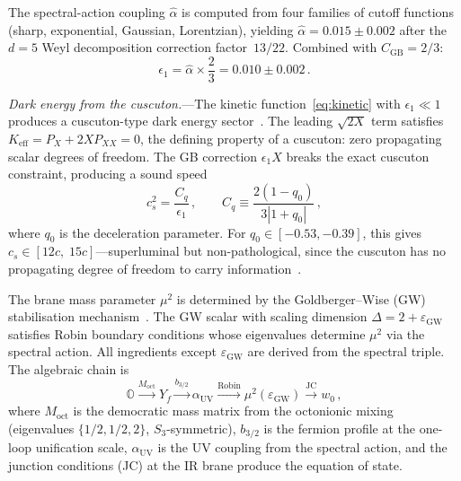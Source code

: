 \documentclass[aps,prl,twocolumn,superscriptaddress]{revtex4-2}
\newcommand{\CGB}{C_{\mathrm{GB}}}
\newcommand{\eps}{\epsilon_1}
\newcommand{\epsGW}{\varepsilon_{\mathrm{GW}}}
\newcommand{\ahat}{\hat{\alpha}}
\begin{document}
The spectral-action coupling $\ahat$ is computed from four families of
cutoff functions (sharp, exponential, Gaussian, Lorentzian), yielding
$\ahat = 0.015 \pm 0.002$ after the $d = 5$ Weyl decomposition correction
factor~$13/22$.  Combined with $\CGB = 2/3$:
\begin{equation}
  \eps = \ahat \times \frac{2}{3} = 0.010 \pm 0.002\,.
  \label{eq:eps1}
\end{equation}



\textit{Dark energy from the cuscuton.}---The kinetic
function~\eqref{eq:kinetic} with $\eps \ll 1$ produces a cuscuton-type dark
energy sector~\cite{Afshordi2007}.  The leading $\sqrt{2X}$ term satisfies
$K_{\mathrm{eff}} = P_X + 2X P_{XX} = 0$, the defining property of a
cuscuton: zero propagating scalar degrees of freedom.  The GB correction
$\eps X$ breaks the exact cuscuton constraint, producing a sound speed
\begin{equation}
  c_s^2 = \frac{C_q}{\eps}\,,\qquad
  C_q \equiv \frac{2(1 - q_0)}{3|1 + q_0|}\,,
  \label{eq:cs}
\end{equation}
where $q_0$ is the deceleration parameter.  For $q_0 \in [-0.53, -0.39]$,
this gives $c_s \in [12c,\; 15c]$---superluminal but non-pathological, since
the cuscuton has no propagating degree of freedom to carry
information~\cite{Babichev2008,Bruneton2007}.

The brane mass parameter $\mu^2$ is determined by the Goldberger--Wise (GW)
stabilisation mechanism~\cite{GW1999}.  The GW scalar with scaling dimension
$\Delta = 2 + \epsGW$ satisfies Robin boundary conditions whose eigenvalues
determine $\mu^2$ via the spectral action.  All ingredients except $\epsGW$
are derived from the spectral triple.  The algebraic chain is
\begin{equation}
  \mathbb{O} \xrightarrow{M_{\mathrm{oct}}}
  Y_f \xrightarrow{b_{3/2}}
  \alpha_{\mathrm{UV}} \xrightarrow{\text{Robin}}
  \mu^2(\epsGW) \xrightarrow{\text{JC}}
  w_0\,,
  \label{eq:algebraic-chain}
\end{equation}
where $M_{\mathrm{oct}}$ is the democratic mass matrix from the octonionic
mixing (eigenvalues $\{1/2, 1/2, 2\}$, $S_3$-symmetric), $b_{3/2}$ is the
fermion profile at the one-loop unification scale, $\alpha_{\mathrm{UV}}$ is
the UV coupling from the spectral action, and the junction conditions (JC) at
the IR brane produce the equation of state.
\end{document}
